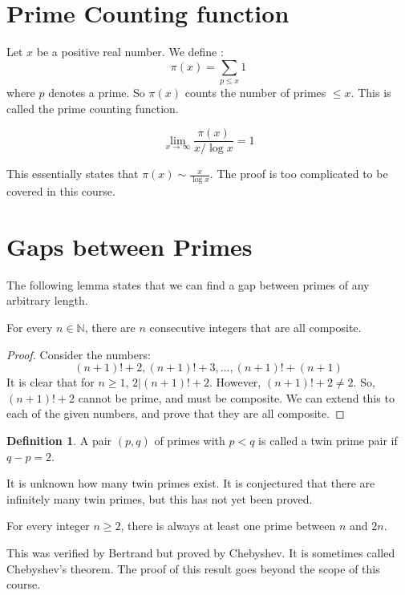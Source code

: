 \documentclass[12pt,letterpaper]{amsbook}
\theoremstyle{definition}
\newtheorem{definition}{Definition} %
\newcommand{\N}{\mathbb{N}}
\begin{document}
\section{Prime Counting function}
Let $x$ be a positive real number. We define :
\[\pi (x) = \sum_{p \leq x} 1\]
where $p$ denotes a prime. So $\pi (x)$ counts the number of primes $\leq x$. This is called the prime counting function.

\begin{theorem}
  \[\lim_{x \rightarrow \infty} \frac{\pi (x)}{x/\log{x}} = 1\]
\end{theorem}

This essentially states that $\pi (x) \sim \frac{x}{\log{x}}$. The proof is too complicated to be covered in this course.

\section{Gaps between Primes}

The following lemma states that we can find a gap between primes of any arbitrary length.

\begin{lemma}
  For every $n \in \N$, there are $n$ consecutive integers that are all composite.
\end{lemma}

\begin{proof}
  Consider the numbers:
  \[(n+1)! + 2, (n+1)! + 3, ... ,(n+1)!+(n+1)\]
  It is clear that for $n \geq 1$, $2|(n+1)!+2$. However, $(n+1)! + 2 \neq 2$. So, $(n+1)!+2$ cannot be prime, and must be composite. We can extend this to each of the given numbers, and prove that they are all composite.
\end{proof}

\begin{definition}
  A pair $(p,q)$ of primes with $p < q$ is called a twin prime pair if $q-p = 2$.
\end{definition}

It is unknown how many twin primes exist. It is conjectured that there are infinitely many twin primes, but this has not yet been proved.

\begin{theorem}
  For every integer $n \geq 2$, there is always at least one prime between $n$ and $2n$.
\end{theorem}

This was verified by Bertrand but proved by Chebyshev. It is sometimes called Chebyshev's theorem. The proof of this result goes beyond the scope of this course.
\end{document}
